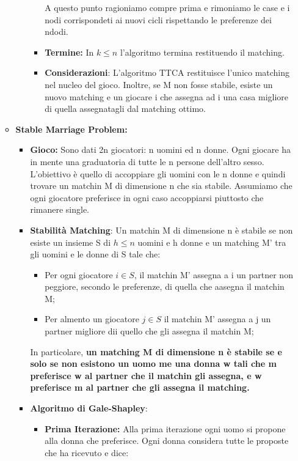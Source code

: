 \documentclass{article}
\theoremstyle{definition}
\theoremstyle{remark}
\begin{document}
\begin{itemize}
\begin{itemize}
\begin{itemize}
\begin{itemize}
                 A questo punto ragioniamo compre prima  e rimoniamo le case e i nodi corrispondeti ai nuovi cicli rispettando le preferenze dei ndodi.
                 \item\textbf{Termine:} In \(k\leq n\) l'algoritmo termina restituendo il matching.
                 \item  \textbf{Considerazioni}: L'algoritmo TTCA restituisce l'unico matching nel nucleo del gioco. Inoltre, se M non fosse stabile, esiste un nuovo matching e un giocare i che assegna ad i una casa migliore di quella assegnatagli dal matching ottimo.
             \end{itemize}
        \end{itemize}
        \item \textbf{Stable Marriage Problem:}\begin{itemize}
            \item \textbf{Gioco:} Sono dati 2n giocatori: n uomini ed n donne. Ogni giocare ha in mente una graduatoria di tutte le n persone dell'altro sesso. L'obiettivo è quello di accoppiare gli uomini con le n donne e quindi trovare
            un matchin M di dimensione n che sia stabile. Assumiamo che ogni giocatore preferisce in ogni caso accoppiarsi piuttosto che rimanere single.
            \item\textbf{Stabilità Matching}: Un matchin M di dimensione n è stabile se non esiste un insieme S di \(h\leq n\) uomini e h donne e un matching M' tra gli uomini e le donne di S tale che:\begin{itemize}
                \item Per ogni giocatore \(i\in S\), il matchin M' assegna a i un partner non peggiore, secondo le preferenze, di quella che aasegna il matchin M;
                \item Per almento un giocatore \(j\in S\) il matchin M' assegna a j un partner migliore dii quello che gli assegna il matchin M;
            \end{itemize}
            In particolare, \textbf{un matching M di dimensione n è stabile se e solo se non esistono un uomo me  una donna w tali che m preferisce w al partner che il matchin gli assegna, e w preferisce m al partner che gli assegna il matching.}
            \item\textbf{Algoritmo di Gale-Shapley}:\begin{itemize}
                \item \textbf{Prima Iterazione:} Alla prima iterazione ogni uomo si propone alla donna che preferisce. Ogni donna considera tutte le proposte che ha ricevuto e dice:

\end{itemize}
\end{itemize}
\end{itemize}
\end{itemize}
\end{document}
